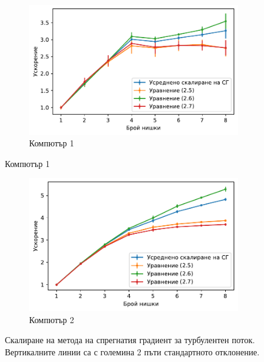 \documentclass[12pt]{report}
\begin{document}
\begin{figure}[H]
  \centering
  \begin{subfigure}[b]{0.8\textwidth}
      \centering
      \includegraphics[width=\textwidth]{Figures/BG/TurbulentCGSpeedUpC1.pdf}
      \caption{Компютър 1}
  \end{subfigure}
\end{figure}
\begin{figure}[H]
	\centering
  \ContinuedFloat
  \begin{subfigure}[b]{0.8\textwidth}
      \centering
      \includegraphics[width=\textwidth]{Figures/BG/TurbulentCGSpeedUpC2.pdf}
      \caption{Компютър 2}
  \end{subfigure}\caption{Скалиране на метода на спрегнатия градиент за турбулентен поток. Вертикалните линии са с големина 2 пъти стандартното отклонение.}
  \label{fig:turbulent-scaling}
\end{figure}
\end{document}

